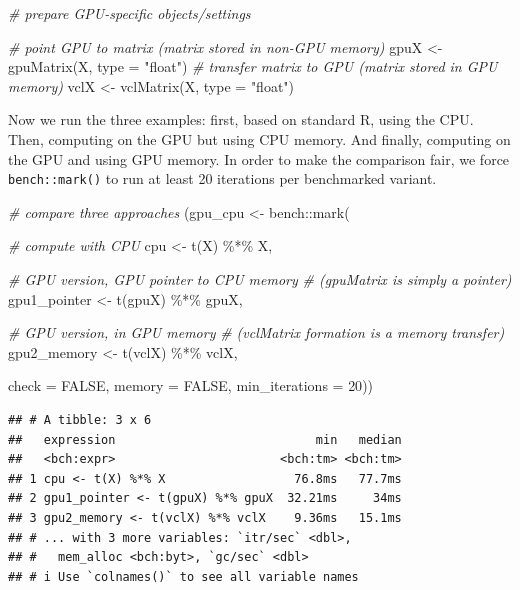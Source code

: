 \documentclass[
  12pt,
]{style/krantz}
\newenvironment{Shaded}{\begin{snugshade}}{\end{snugshade}}
\newcommand{\AttributeTok}[1]{\textcolor[rgb]{0.77,0.63,0.00}{#1}}
\newcommand{\CommentTok}[1]{\textcolor[rgb]{0.56,0.35,0.01}{\textit{#1}}}
\newcommand{\ConstantTok}[1]{\textcolor[rgb]{0.00,0.00,0.00}{#1}}
\newcommand{\DecValTok}[1]{\textcolor[rgb]{0.00,0.00,0.81}{#1}}
\newcommand{\FunctionTok}[1]{\textcolor[rgb]{0.00,0.00,0.00}{#1}}
\newcommand{\NormalTok}[1]{#1}
\newcommand{\OtherTok}[1]{\textcolor[rgb]{0.56,0.35,0.01}{#1}}
\newcommand{\SpecialCharTok}[1]{\textcolor[rgb]{0.00,0.00,0.00}{#1}}
\newcommand{\StringTok}[1]{\textcolor[rgb]{0.31,0.60,0.02}{#1}}
\begin{document}
\begin{Shaded}
\begin{Highlighting}[]
\CommentTok{\# prepare GPU{-}specific objects/settings}

\CommentTok{\# point GPU to matrix (matrix stored in non{-}GPU memory)}
\NormalTok{gpuX }\OtherTok{\textless{}{-}} \FunctionTok{gpuMatrix}\NormalTok{(X, }\AttributeTok{type =} \StringTok{"float"}\NormalTok{)}
\CommentTok{\# transfer matrix to GPU (matrix stored in GPU memory)}
\NormalTok{vclX }\OtherTok{\textless{}{-}} \FunctionTok{vclMatrix}\NormalTok{(X, }\AttributeTok{type =} \StringTok{"float"}\NormalTok{)  }
\end{Highlighting}
\end{Shaded}

Now we run the three examples: first, based on standard R, using the CPU. Then, computing on the GPU but using CPU memory. And finally, computing on the GPU and using GPU memory. In order to make the comparison fair, we force \texttt{bench::mark()} to run at least 20 iterations per benchmarked variant.

\begin{Shaded}
\begin{Highlighting}[]
\CommentTok{\# compare three approaches}
\NormalTok{(gpu\_cpu }\OtherTok{\textless{}{-}}\NormalTok{ bench}\SpecialCharTok{::}\FunctionTok{mark}\NormalTok{(}
  
  \CommentTok{\# compute with CPU }
\NormalTok{  cpu }\OtherTok{\textless{}{-}} \FunctionTok{t}\NormalTok{(X) }\SpecialCharTok{\%*\%}\NormalTok{ X,}
  
  \CommentTok{\# GPU version, GPU pointer to CPU memory }
  \CommentTok{\# (gpuMatrix is simply a pointer)}
\NormalTok{  gpu1\_pointer }\OtherTok{\textless{}{-}} \FunctionTok{t}\NormalTok{(gpuX) }\SpecialCharTok{\%*\%}\NormalTok{ gpuX,}
  
  \CommentTok{\# GPU version, in GPU memory }
  \CommentTok{\# (vclMatrix formation is a memory transfer)}
\NormalTok{  gpu2\_memory }\OtherTok{\textless{}{-}} \FunctionTok{t}\NormalTok{(vclX) }\SpecialCharTok{\%*\%}\NormalTok{ vclX,}
 
\AttributeTok{check =} \ConstantTok{FALSE}\NormalTok{, }\AttributeTok{memory =} \ConstantTok{FALSE}\NormalTok{, }\AttributeTok{min\_iterations =} \DecValTok{20}\NormalTok{))}
\end{Highlighting}
\end{Shaded}

\begin{verbatim}
## # A tibble: 3 x 6
##   expression                            min   median
##   <bch:expr>                       <bch:tm> <bch:tm>
## 1 cpu <- t(X) %*% X                  76.8ms   77.7ms
## 2 gpu1_pointer <- t(gpuX) %*% gpuX  32.21ms     34ms
## 3 gpu2_memory <- t(vclX) %*% vclX    9.36ms   15.1ms
## # ... with 3 more variables: `itr/sec` <dbl>,
## #   mem_alloc <bch:byt>, `gc/sec` <dbl>
## # i Use `colnames()` to see all variable names
\end{verbatim}
\end{document}
